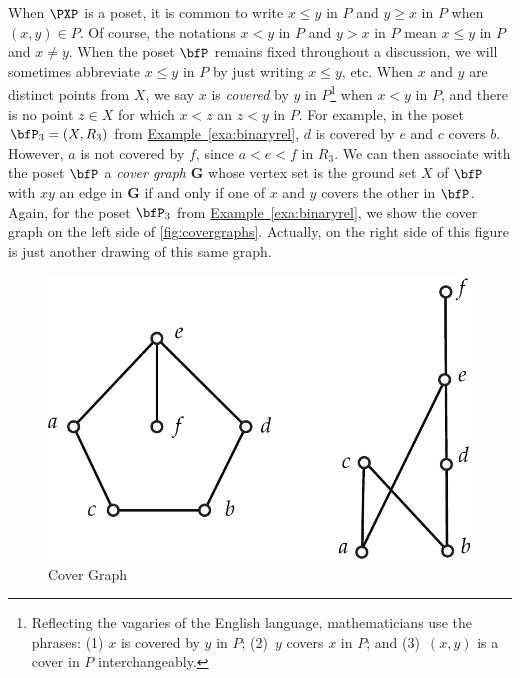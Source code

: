 When $\PXP$ is a poset, it is common to write $x\le y$ in $P$ and
$y\ge x$ in $P$ when $(x,y)\in P$. Of course, the notations $x<y$ in
$P$ and $y>x$ in $P$ mean $x\le y$ in $P$ and $x\ne y$.  When the
poset $\bfP$ remains fixed throughout a discussion, we will sometimes
abbreviate $x\le y$ in $P$ by just writing $x\le y$, etc.  When $x$
and $y$ are distinct points from $X$, we say $x$ is \textit{covered}
by $y$ in $P$\footnote{Reflecting the vagaries of the English
  language, mathematicians use the phrases: (1) $x$ is covered by $y$
  in $P$; (2)~$y$ covers $x$ in $P$; and (3)~$(x,y)$ is a cover in $P$
  interchangeably.}  when $x<y$ in $P$, and there is no point $z\in X$
for which $x<z$ an $z<y$ in $P$.  For example, in the poset
$\bfP_3=(X,R_3)$ from
\hyperref[exa:binaryrel]{Example~\ref*{exa:binaryrel}}, $d$ is covered
by $e$ and $c$ covers $b$. However, $a$ is not covered by $f$, since
$a<e<f$ in $R_3$.  We can then associate with the poset $\bfP$ a
\textit{cover graph} $\mathbf{G}$ whose vertex set is the ground set
$X$ of $\bfP$ with $xy$ an edge in $\mathbf{G}$ if and only if one of
$x$ and $y$ covers the other in $\bfP$.  Again, for the poset $\bfP_3$
from \hyperref[exa:binaryrel]{Example~\ref*{exa:binaryrel}}, we show
the cover graph on the left side of \autoref{fig:covergraphs}.
Actually, on the right side of this figure is just another drawing of
this same graph.

\begin{figure}
\begin{center}
\includegraphics*[scale=.4]{posets-figs/covergraphs.pdf}
\caption{Cover Graph}
\label{fig:covergraphs}
\end{center}
\end{figure}

